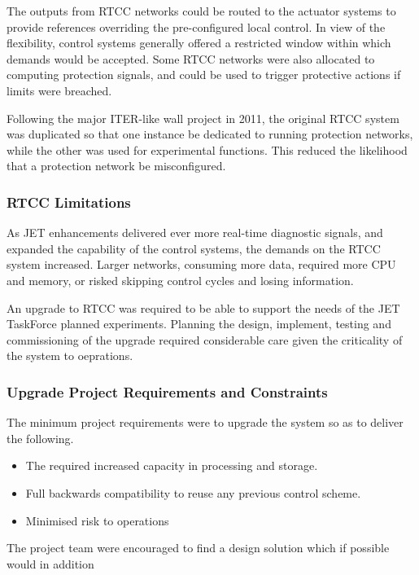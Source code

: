 \documentclass[5p]{elsarticle}
\begin{document}
The outputs from RTCC networks could be routed to the actuator systems
to provide references overriding the pre-configured local control.
In view of the flexibility, control systems generally offered a restricted
window within which demands would be accepted.
Some RTCC networks were also allocated to computing protection signals,
and could be used to trigger protective actions if limits were breached.

Following the major ITER-like wall project in 2011, the original RTCC
system was duplicated so that one instance be dedicated to running
protection networks, while the other was used for experimental functions.
This reduced the likelihood that a protection network be misconfigured.

\subsubsection{RTCC Limitations}

As JET enhancements delivered ever more real-time diagnostic signals,
and expanded the capability of the control systems, the demands
on the RTCC system increased.  Larger networks, consuming more data,
required more CPU and memory, or risked skipping control cycles
and losing information.

An upgrade to RTCC was required to be able to support the needs
of the JET TaskForce planned experiments.  Planning the design, implement,
testing and commissioning of the upgrade required considerable
care given the criticality of the system to oeprations.


\subsubsection{Upgrade Project Requirements and Constraints}

The minimum project requirements were to 
upgrade the system so as to deliver the following.

\begin{itemize}
	\item[REQ-1]{The required increased capacity in processing and storage.}
	\item[REQ-2]{Full backwards compatibility to reuse any previous control scheme.}
	\item[REQ-3]{Minimised risk to operations}
\end{itemize}

The project team were encouraged to find a design solution which
if possible would in addition
\end{document}
